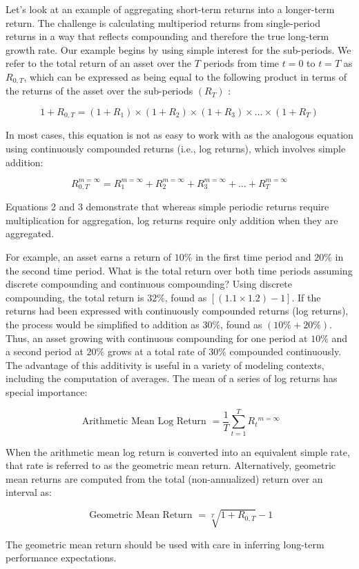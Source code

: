 \documentclass[11pt]{article}
\begin{document}
Let's look at an example of aggregating short-term returns into a longer-term return. The challenge is calculating multiperiod returns from single-period returns in a way that reflects compounding and therefore the true long-term growth rate. Our example begins by using simple interest for the sub-periods. We refer to the total return of an asset over the $T$ periods from time $t=0$ to $t=T$ as $R_{0, T}$, which can be expressed as being equal to the following product in terms of the returns of the asset over the sub-periods $\left(R_{T}\right)$ :


\begin{equation*}
1+R_{0, T}=\left(1+R_{1}\right) \times\left(1+R_{2}\right) \times\left(1+R_{3}\right) \times \ldots \times\left(1+R_{T}\right) \tag{2}
\end{equation*}


In most cases, this equation is not as easy to work with as the analogous equation using continuously compounded returns (i.e., log returns), which involves simple addition:

$$
R_{0, T}^{m=\infty}=R_{1}^{m=\infty}+R_{2}^{m=\infty}+R_{3}^{m=\infty}+\ldots+R_{T}^{m=\infty}
$$

Equations 2 and 3 demonstrate that whereas simple periodic returns require multiplication for aggregation, log returns require only addition when they are aggregated.

For example, an asset earns a return of $10 \%$ in the first time period and $20 \%$ in the second time period. What is the total return over both time periods assuming discrete compounding and continuous compounding? Using discrete compounding, the total return is $32 \%$, found as $[(1.1 \times 1.2)-1]$. If the returns had been expressed with continuously compounded returns (log returns), the process would be simplified to addition as $30 \%$, found as $(10 \%+20 \%)$. Thus, an asset growing with continuous compounding for one period at $10 \%$ and a second period at $20 \%$ grows at a total rate of $30 \%$ compounded continuously. The advantage of this additivity is useful in a variety of modeling contexts, including the computation of averages. The mean of a series of log returns has special importance:


\begin{equation*}
\text { Arithmetic Mean Log Return }=\frac{1}{T} \sum_{t=1}^{T} R_{t}{ }^{m=\infty} \tag{4}
\end{equation*}


When the arithmetic mean log return is converted into an equivalent simple rate, that rate is referred to as the geometric mean return. Alternatively, geometric mean returns are computed from the total (non-annualized) return over an interval as:


\begin{equation*}
\text { Geometric Mean Return }=\sqrt[T]{1+R_{0, T}}-1 \tag{5}
\end{equation*}


The geometric mean return should be used with care in inferring long-term performance expectations.
\end{document}
